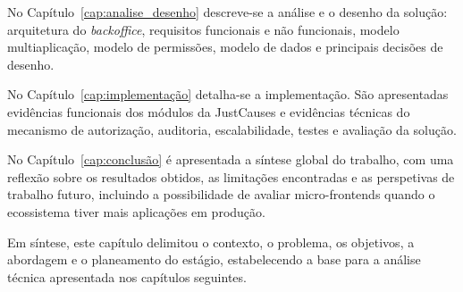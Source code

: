 No Capítulo~\ref{cap:analise_desenho} descreve-se a análise e o desenho da solução: arquitetura do \textit{backoffice}, requisitos funcionais e não funcionais, modelo multiaplicação, modelo de permissões, modelo de dados e principais decisões de desenho.

No Capítulo~\ref{cap:implementação} detalha-se a implementação. São apresentadas evidências funcionais dos módulos da JustCauses e evidências técnicas do mecanismo de autorização, auditoria, escalabilidade, testes e avaliação da solução.

No Capítulo~\ref{cap:conclusão} é apresentada a síntese global do trabalho, com uma reflexão sobre os resultados obtidos, as limitações encontradas e as perspetivas de trabalho futuro, incluindo a possibilidade de avaliar micro-frontends quando o ecossistema tiver mais aplicações em produção.

Em síntese, este capítulo delimitou o contexto, o problema, os objetivos, a abordagem e o planeamento do estágio, estabelecendo a base para a análise técnica apresentada nos capítulos seguintes.
